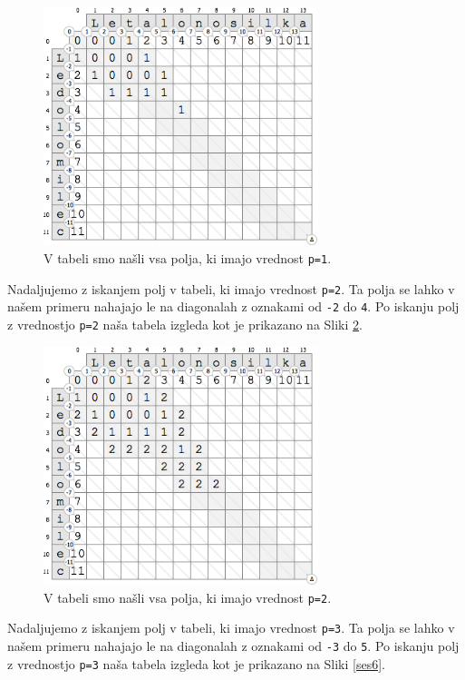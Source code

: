 \documentclass[a4paper, 12pt, twoside]{book}
\begin{document}
\begin{figure}[placement h]
\begin{center}
\includegraphics[width=8cm]{ses4.png}
\end{center}
\caption{V tabeli smo našli vsa polja, ki imajo vrednost {\tt p=1}.}
\label{ses4}
\end{figure}

Nadaljujemo z iskanjem polj v tabeli, ki imajo vrednost {\tt p=2}. Ta polja se lahko v našem primeru nahajajo le na diagonalah z oznakami od {\tt -2} do {\tt 4}. Po iskanju polj z vrednostjo {\tt p=2} naša tabela izgleda kot je prikazano na Sliki \ref{ses5}.

\begin{figure}[placement h]
\begin{center}
\includegraphics[width=8cm]{ses5.png}
\end{center}
\caption{V tabeli smo našli vsa polja, ki imajo vrednost {\tt p=2}.}
\label{ses5}
\end{figure}

\pagebreak

Nadaljujemo z iskanjem polj v tabeli, ki imajo vrednost {\tt p=3}. Ta polja se lahko v našem primeru nahajajo le na diagonalah z oznakami od {\tt -3} do {\tt 5}. Po iskanju polj z vrednostjo {\tt p=3} naša tabela izgleda kot je prikazano na Sliki \ref{ses6}.
\end{document}
